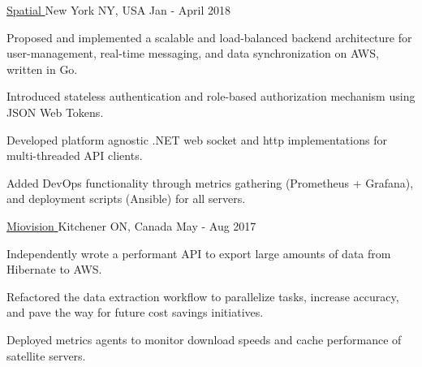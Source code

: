 \begin{cventries}
  {\href{https://spatial.is}{Spatial \faExternalLink}} {New York NY, USA} {Jan -
    April 2018} {
    \begin{cvitems}
    \item Proposed and implemented a scalable and load-balanced backend
      architecture for user-management, real-time messaging, and data
      synchronization on AWS, written in Go.
    \item Introduced stateless authentication and role-based authorization
      mechanism using JSON Web Tokens.
    \item Developed platform agnostic .NET web socket and http implementations
      for multi-threaded API clients. 
    \item Added DevOps functionality through metrics gathering (Prometheus +
      Grafana), and deployment scripts (Ansible) for all servers.
    \end{cvitems}
  }
    
  {\href{https://miovision.com}{Miovision \faExternalLink}} {Kitchener ON,
    Canada} {May - Aug 2017} {
    \begin{cvitems}
    \item Independently wrote a performant API to export large amounts of data
      from Hibernate to AWS.
    \item Refactored the data extraction workflow to parallelize tasks, increase
      accuracy, and pave the way for future cost savings initiatives.
    \item Deployed metrics agents to monitor download speeds and cache
      performance of satellite servers. 
    \end{cvitems}
  }

\end{cventries}
